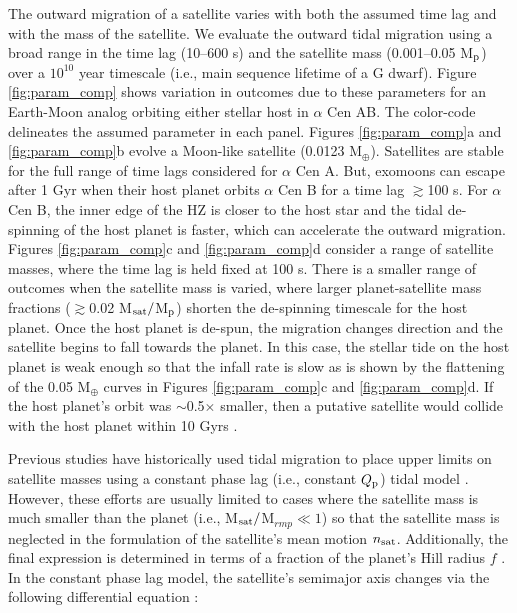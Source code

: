 \documentclass[preprint]{aastex63}
\begin{document}
The outward migration of a satellite varies with both the assumed time lag and with the mass of the satellite.  We evaluate the outward tidal migration using a broad range in the time lag (10--600 s) and the satellite mass (0.001--0.05 M$_{\rm p}$) over a $10^{10}$ year timescale (i.e., main sequence lifetime of a G dwarf).  Figure \ref{fig:param_comp} shows variation in outcomes due to these parameters for an Earth-Moon analog orbiting either stellar host in $\alpha$ Cen AB.  The color-code delineates the assumed parameter in each panel.  Figures \ref{fig:param_comp}a and \ref{fig:param_comp}b evolve a Moon-like satellite (0.0123 M$_\oplus$).  Satellites are stable for the full range of time lags considered for $\alpha$ Cen A.  But, exomoons can escape after 1 Gyr when their host planet orbits $\alpha$ Cen B for a time lag $\gtrsim$100 s.  For $\alpha$ Cen B, the inner edge of the HZ is closer to the host star and the tidal de-spinning of the host planet is faster, which can accelerate the outward migration.  Figures \ref{fig:param_comp}c and \ref{fig:param_comp}d consider a range of satellite masses, where the time lag is held fixed at 100 s.  There is a smaller range of outcomes when the satellite mass is varied, where larger planet-satellite mass fractions ($\gtrsim$0.02 M$_{\rm sat}/$M$_{\rm p}$) shorten the de-spinning timescale for the host planet.  Once the host planet is de-spun, the migration changes direction and the satellite begins to fall towards the planet.  In this case, the stellar tide on the host planet is weak enough so that the infall rate is slow as is shown by the flattening of the 0.05 M$_\oplus$ curves in Figures \ref{fig:param_comp}c and \ref{fig:param_comp}d.  If the host planet's orbit was $\sim$0.5$\times$ smaller, then a putative satellite would collide with the host planet within 10 Gyrs \citep[e.g.,][]{Sasaki2012,Sasaki2014}.

Previous studies have historically used tidal migration to place upper limits on satellite masses using a constant phase lag (i.e., constant $Q_{\rm p}$) tidal model \citep{Goldreich1966,Barnes2002,Domingos2006}.  However, these efforts are usually limited to cases where the satellite mass is much smaller than the planet (i.e., M$_{\rm sat}/$M$_{rm p} \ll 1$) so that the satellite mass is neglected in the formulation of the satellite's mean motion $n_{\rm sat}$.  Additionally, the final expression is determined in terms of a fraction of the planet’s Hill radius $f$ \citep[see their Equation 8][]{Barnes2002}.  In the constant phase lag model, the satellite's semimajor axis changes via the following differential equation \citep{Murray1999}:
\end{document}
